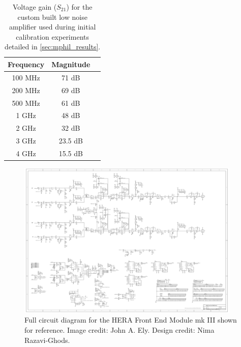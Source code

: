 \begin{table}
    \centering
    \begin{tabular}{ |c|c|c| }
        \hline
        Frequency & Magnitude \\
        \hline 
        100 MHz & 71 dB \\
        200 MHz & 69 dB \\
        500 MHz & 61 dB \\
        1 GHz & 48 dB \\
        2 GHz & 32 dB \\
        3 GHz & 23.5 dB \\
        4 GHz & 15.5 dB \\
        \hline 
    \end{tabular}
    \caption{Voltage gain ($S_{21}$) for the custom built low noise amplifier used during initial calibration experiments detailed in \cref{sec:mphil_results}.}
    \label{tab:mphil_lna}
\end{table}

\begin{figure}
    \centering
    \includegraphics[angle=90,width=0.95\textwidth]{fem_schematic}
    \caption{Full circuit diagram for the HERA Front End Module mk III shown for reference. Image credit: John A. Ely. Design credit: Nima Razavi-Ghods.}
    \label{fig:fem_schematic}
\end{figure}

